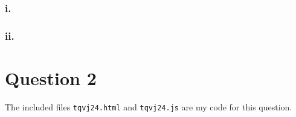 \documentclass[a4paper,12pt]{article}
\begin{document}
\subsubsection*{i.}
\subsubsection*{ii.}

\section*{Question 2}
The included files \texttt{tqvj24.html} and \texttt{tqvj24.js} are my code for this question.
\end{document}
